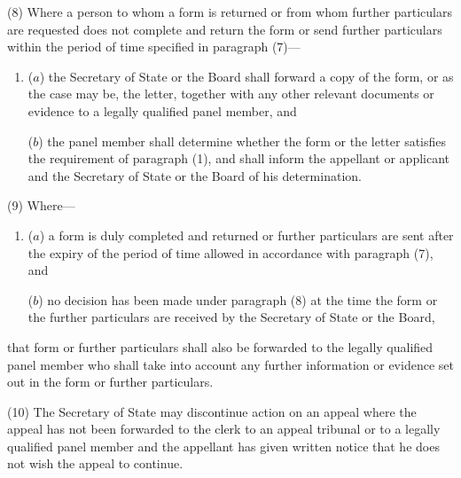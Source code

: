 \documentclass[12pt,a4paper]{article}
\begin{document}
(8) Where a person to whom a form is returned or from whom further particulars are requested does not complete and return the form or send further particulars within the period of time specified in paragraph (7)—
\begin{enumerate}\item[]
($a$) the Secretary of State 
or the Board   %
shall forward a copy of the form, or as the case may be, the letter, together with any other relevant documents or evidence to a legally qualified panel member, and

($b$) the panel member shall determine whether the form or the letter satisfies the requirement of paragraph (1), and shall inform the appellant or applicant and the Secretary of State 
or the Board   %
of his determination.
\end{enumerate}

(9) Where—
\begin{enumerate}\item[]
($a$) a form is duly completed and returned or further particulars are sent after the expiry of the period of time allowed in accordance with paragraph (7), and

($b$) no decision has been made under paragraph (8) at the time the form or the further particulars are received by the Secretary of State
or the Board,   %
\end{enumerate}
that form or further particulars shall also be forwarded to the legally qualified panel member who shall take into account any further information or evidence set out in the form or further particulars.

(10) The Secretary of State may discontinue action on an appeal where the appeal has not been forwarded to the clerk to an appeal tribunal or to a legally qualified panel member and the appellant has given written notice that he does not wish the appeal to continue.

\end{document}
